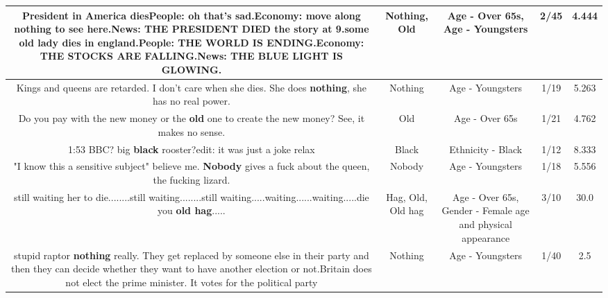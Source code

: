 \documentclass[11pt]{article}
\newlength\mylength
\begin{document}
\begin{center}
\begin{longtable}{|C{.65\mylength}|C{.30\mylength}|C{.12\mylength}|C{.12\mylength}|C{.12\mylength}|}
  \small President in America diesPeople: oh that's sad.Economy: move along \textbf{nothing} to see here.News: THE PRESIDENT  DIED the story at 9.some \textbf{old} lady dies in england.People: THE WORLD IS ENDING.Economy: THE STOCKS ARE FALLING.News: THE BLUE LIGHT IS GLOWING.\normalsize   & Nothing, Old & Age - Over 65s, Age - Youngsters & 2/45 & 4.444 \\  \hline
  \small Kings and queens are retarded. I don't care when she dies. She does \textbf{nothing}, she has no real power.\normalsize   & Nothing & Age - Youngsters & 1/19 & 5.263 \\  \hline
  \small Do you pay with the new money or the \textbf{old} one to create the new money? See, it makes no sense.\normalsize   & Old & Age - Over 65s & 1/21 & 4.762 \\  \hline
  \small 1:53 BBC? big \textbf{black} rooster?edit: it was just a joke relax\normalsize   & Black & Ethnicity - Black & 1/12 & 8.333 \\  \hline
  \small "I know this a sensitive subject" believe me. \textbf{Nobody} gives a fuck about the queen, the fucking lizard.\normalsize   & Nobody & Age - Youngsters & 1/18 & 5.556 \\  \hline
  \small still waiting her to die........still waiting........still waiting.....waiting......waiting.....die you \textbf{o\textbf{ld} h\textbf{ag}}.....\normalsize   & Hag, Old, Old hag & Age - Over 65s, Gender - Female age and physical appearance & 3/10 & 30.0 \\  \hline
  \small stupid raptor \textbf{nothing} really. They get replaced by someone else in their party and then they can decide whether they want to have another election or not.Britain does not elect the prime minister. It votes for the political party\normalsize   & Nothing & Age - Youngsters & 1/40 & 2.5 \\  \hline

\end{longtable}
\end{center}
\end{document}
